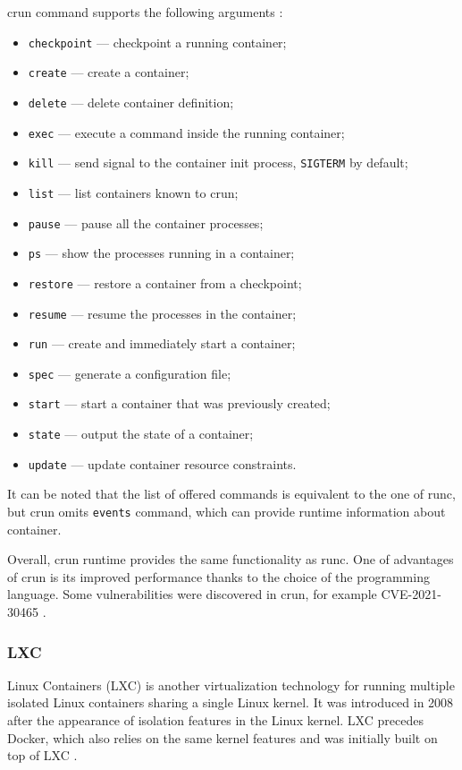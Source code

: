 crun command supports the following arguments \cite{m:crun}:
\begin{itemize}
  \item \texttt{checkpoint} — checkpoint a running container;
  \item \texttt{create} — create a container;
  \item \texttt{delete} — delete container definition;
  \item \texttt{exec} — execute a command inside the running container;
  \item \texttt{kill} — send signal to the container init process, \texttt{SIGTERM} by default;
  \item \texttt{list} — list containers known to crun;
  \item \texttt{pause} — pause all the container processes;
  \item \texttt{ps} — show the processes running in a container;
  \item \texttt{restore} — restore a container from a checkpoint;
  \item \texttt{resume} — resume the processes in the container;
  \item \texttt{run} — create and immediately start a container;
  \item \texttt{spec} — generate a configuration file;
  \item \texttt{start} — start a container that was previously created;
  \item \texttt{state} — output the state of a container;
  \item \texttt{update} — update container resource constraints.
\end{itemize}

It can be noted that the list of offered commands is equivalent to the one of runc, but crun omits \texttt{events} command, which can provide runtime information about container.

Overall, crun runtime provides the same functionality as runc. One of advantages of crun is its improved performance thanks to the choice of the programming language. Some vulnerabilities were discovered in crun, for example CVE-2021-30465 \cite{s:CVE-2021-30465}.

\subsubsection*{LXC}

Linux Containers (LXC) is another virtualization technology for running multiple isolated Linux containers sharing a single Linux kernel. It was introduced in 2008 after the appearance of isolation features in the Linux kernel. LXC precedes Docker, which also relies on the same kernel features and was initially built on top of LXC \cite{acm:1}.

